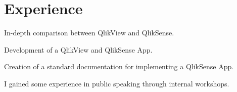 \documentclass[letterpaper]{my-resume} %
\begin{document}
\begin{minipage}[t]{0.66\textwidth} %


\section{Experience}

\vspace{\topsep} %
\begin{tightitemize}
\item In-depth comparison between QlikView and QlikSense.
\item Development of a QlikView and QlikSense App.
\item Creation of a standard documentation for implementing a QlikSense App.
\item I gained some experience in public speaking through internal workshops.
\end{tightitemize}

\sectionspace %




\end{minipage}
\end{document}
